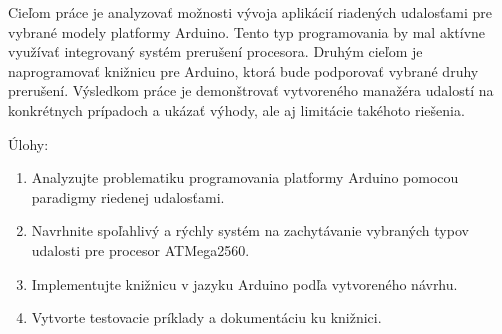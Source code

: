 Cieľom práce je analyzovať možnosti vývoja aplikácií riadených udalosťami pre vybrané modely platformy Arduino. Tento typ programovania by mal aktívne využívať integrovaný systém prerušení procesora. Druhým cieľom je naprogramovať knižnicu pre Arduino, ktorá bude podporovať vybrané druhy prerušení. Výsledkom práce je demonštrovať vytvoreného manažéra udalostí na konkrétnych prípadoch a ukázať výhody, ale aj limitácie takéhoto riešenia.

Úlohy:

\begin{enumerate}
    \item   Analyzujte problematiku programovania platformy Arduino pomocou paradigmy riedenej udalosťami.
    \item Navrhnite spoľahlivý a rýchly systém na zachytávanie vybraných typov udalosti pre procesor ATMega2560.
    \item Implementujte knižnicu v jazyku Arduino podľa vytvoreného návrhu.
    \item Vytvorte testovacie príklady a dokumentáciu ku knižnici.
\end{enumerate}
